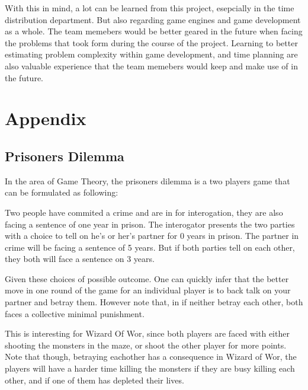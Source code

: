 \documentclass{article}
\begin{document}
  With this in mind, a lot can be learned from this project, esepcially in the time distribution department. But also regarding game engines and game development as a whole. The team memebers would be better geared in the future when facing the problems that took form during the course of the project. Learning to better estimating problem complexity within game development, and time planning are also valuable experience that the team memebers would keep and make use of in the future.

\newpage
  \section{Appendix}
  \subsection{Prisoners Dilemma}

  In the area of Game Theory, the prisoners dilemma is a two players game that can be formulated as following:

  Two people have commited a crime and are in for interogation, they are also facing a sentence of one year in prison. The interogator presents the two parties with a choice to tell on he's or her's partner for 0 years in prison. The partner in crime will be facing a sentence of 5 years. But if both parties tell on each other, they both will face a sentence on 3 years.

  Given these choices of possible outcome. One can quickly infer that the better move in one round of the game for an individual player is to back talk on your partner and betray them. However note that, in if neither betray each other, both faces a collective minimal punishment.

  This is interesting for Wizard Of Wor, since both players are faced with either shooting the monsters in the maze, or shoot the other player for more points. Note that though, betraying eachother has a consequence in Wizard of Wor, the players will have a harder time killing the monsters if they are busy killing each other, and if one of them has depleted their lives.
\end{document}
